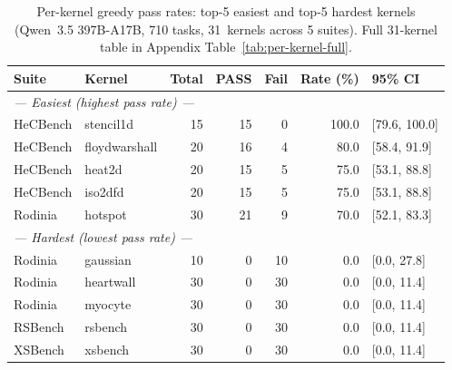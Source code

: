 \documentclass{article}
\begin{document}
\begin{table}[t]
\centering
\caption{Per-kernel greedy pass rates: top-5 easiest and top-5 hardest kernels (Qwen~3.5 397B-A17B, 710 tasks, 31~kernels across 5 suites). Full 31-kernel table in Appendix Table~\ref{tab:per-kernel-full}.}
\label{tab:per-kernel}
\small
\begin{tabular}{@{}llrrrrl@{}}
\toprule
Suite & Kernel & Total & PASS & Fail & Rate (\%) & 95\% CI \\
\midrule
\multicolumn{7}{l}{\textit{--- Easiest (highest pass rate) ---}} \\
HeCBench & stencil1d & 15 & 15 & 0 & 100.0 & [79.6, 100.0] \\ %
HeCBench & floydwarshall & 20 & 16 & 4 & 80.0 & [58.4, 91.9] \\ %
HeCBench & heat2d & 20 & 15 & 5 & 75.0 & [53.1, 88.8] \\ %
HeCBench & iso2dfd & 20 & 15 & 5 & 75.0 & [53.1, 88.8] \\ %
Rodinia & hotspot & 30 & 21 & 9 & 70.0 & [52.1, 83.3] \\ %
\midrule
\multicolumn{7}{l}{\textit{--- Hardest (lowest pass rate) ---}} \\
Rodinia & gaussian & 10 & 0 & 10 & 0.0 & [0.0, 27.8] \\ %
Rodinia & heartwall & 30 & 0 & 30 & 0.0 & [0.0, 11.4] \\ %
Rodinia & myocyte & 30 & 0 & 30 & 0.0 & [0.0, 11.4] \\ %
RSBench & rsbench & 30 & 0 & 30 & 0.0 & [0.0, 11.4] \\ %
XSBench & xsbench & 30 & 0 & 30 & 0.0 & [0.0, 11.4] \\ %
\bottomrule
\end{tabular}
\end{table}
\end{document}
